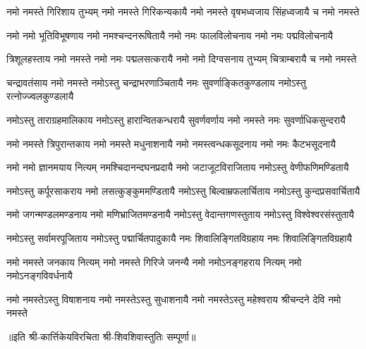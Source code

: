 
\begin{AutoCols}[\maxColumns]
\fourlineindentedshloka
{नमो नमस्ते गिरिशाय तुभ्यम्}
{नमो नमस्ते गिरिकन्यकायै}
{नमो नमस्ते वृषभध्वजाय}
{सिंहध्वजायै च नमो नमस्ते}

\fourlineindentedshloka
{नमो नमो भूतिविभूषणाय}
{नमो नमश्चन्दनरूषितायै}
{नमो नमः फालविलोचनाय}
{नमो नमः पद्मविलोचनायै}

\fourlineindentedshloka
{त्रिशूलहस्ताय नमो नमस्ते}
{नमो नमः पद्मलसत्करायै}
{नमो नमो दिग्वसनाय तुभ्यम्}
{चित्राम्बरायै च नमो नमस्ते}

\fourlineindentedshloka
{चन्द्रावतंसाय नमो नमस्ते}
{नमोऽस्तु चन्द्राभरणाञ्चितायै}
{नमः सुवर्णाङ्कितकुण्डलाय}
{नमोऽस्तु रत्नोज्ज्वलकुण्डलायै}

\fourlineindentedshloka
{नमोऽस्तु ताराग्रहमालिकाय}
{नमोऽस्तु हारान्वितकन्धरायै}
{सुवर्णवर्णाय नमो नमस्ते}
{नमः सुवर्णाधिकसुन्दरायै}

\fourlineindentedshloka
{नमो नमस्ते त्रिपुरान्तकाय}
{नमो नमस्ते मधुनाशनायै}
{नमो नमस्त्वन्धकसूदनाय}
{नमो नमः कैटभसूदनायै}

\fourlineindentedshloka
{नमो नमो ज्ञानमयाय नित्यम्}
{नमश्चिदानन्दघनप्रदायै}
{नमो जटाजूटविराजिताय}
{नमोऽस्तु वेणीफणिमण्डितायै}

\fourlineindentedshloka
{नमोऽस्तु कर्पूरसाकराय}
{नमो लसत्कुङ्कुममण्डितायै}
{नमोऽस्तु बिल्वाम्रफलार्चिताय}
{नमोऽस्तु कुन्दप्रसवार्चितायै}

\fourlineindentedshloka
{नमो जगन्मण्डलमण्डनाय}
{नमो मणिभ्राजितमण्डनायै}
{नमोऽस्तु वेदान्तगणस्तुताय}
{नमोऽस्तु विश्वेश्वरसंस्तुतायै}

\fourlineindentedshloka
{नमोऽस्तु सर्वामरपूजिताय}
{नमोऽस्तु पद्मार्चितपादुकायै}
{नमः शिवालिङ्गितविग्रहाय}
{नमः शिवालिङ्गितविग्रहायै}

\fourlineindentedshloka
{नमो नमस्ते जनकाय नित्यम्}
{नमो नमस्ते गिरिजे जनन्यै}
{नमो नमोऽनङ्गहराय नित्यम्}
{नमो नमोऽनङ्गविवर्धनायै}

\fourlineindentedshloka
{नमो नमस्तेऽस्तु विषाशनाय}
{नमो नमस्तेऽस्तु सुधाशनायै}
{नमो नमस्तेऽस्तु महेश्वराय}
{श्रीचन्दने देवि नमो नमस्ते}
\end{AutoCols}
॥इति श्री-कार्त्तिकेयविरचिता श्री-शिवशिवास्तुतिः सम्पूर्णा॥